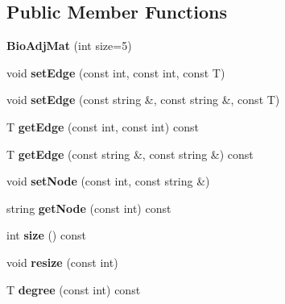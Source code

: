\subsection*{Public Member Functions}
\begin{DoxyCompactItemize}
\item 
\mbox{\label{class_bio_adj_mat_abfaa94d4d0814a980c35ac6073397eb6}} 
{\bfseries Bio\+Adj\+Mat} (int size=5)
\item 
\mbox{\label{class_bio_adj_mat_a2ba626f1896a24fd77d6ba708702a7c5}} 
void {\bfseries set\+Edge} (const int, const int, const T)
\item 
\mbox{\label{class_bio_adj_mat_a328e85a8522c588dbd41032824998560}} 
void {\bfseries set\+Edge} (const string \&, const string \&, const T)
\item 
\mbox{\label{class_bio_adj_mat_a8af45dbfbe9ae88d102c4653a97eb8d7}} 
T {\bfseries get\+Edge} (const int, const int) const
\item 
\mbox{\label{class_bio_adj_mat_af787a393b9d9ccb67fd3bd0640b7de14}} 
T {\bfseries get\+Edge} (const string \&, const string \&) const
\item 
\mbox{\label{class_bio_adj_mat_ae75e3faa050519d01c17390da4e9e89c}} 
void {\bfseries set\+Node} (const int, const string \&)
\item 
\mbox{\label{class_bio_adj_mat_a2bf70c01ef7874c1ae71566f7dfe0419}} 
string {\bfseries get\+Node} (const int) const
\item 
\mbox{\label{class_bio_adj_mat_a12b4686ed66a364465b5ce737df1372f}} 
int {\bfseries size} () const
\item 
\mbox{\label{class_bio_adj_mat_abe8ceb70c32c6d7a4e736c54beefd84c}} 
void {\bfseries resize} (const int)
\item 
\mbox{\label{class_bio_adj_mat_aae1123025ee24d47be666d35b12619b6}} 
T {\bfseries degree} (const int) const
\item 

\end{DoxyCompactItemize}
